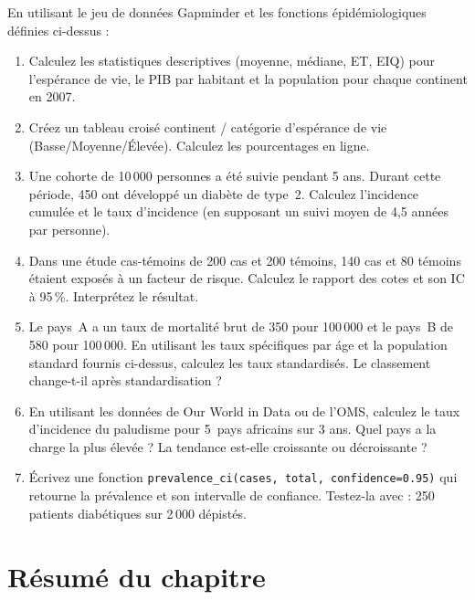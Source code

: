 \begin{exercise}
En utilisant le jeu de donn\'ees Gapminder et les fonctions \'epid\'emiologiques d\'efinies ci-dessus :
\begin{enumerate}
  \item Calculez les statistiques descriptives (moyenne, m\'ediane, ET, EIQ) pour l'esp\'erance de vie, le PIB par habitant et la population pour chaque continent en 2007.
  \item Cr\'eez un tableau crois\'e continent / cat\'egorie d'esp\'erance de vie (Basse/Moyenne/\'Elev\'ee). Calculez les pourcentages en ligne.
  \item Une cohorte de 10\,000 personnes a \'et\'e suivie pendant 5 ans. Durant cette p\'eriode, 450 ont d\'evelopp\'e un diab\`ete de type~2. Calculez l'incidence cumul\'ee et le taux d'incidence (en supposant un suivi moyen de 4,5 ann\'ees par personne).
  \item Dans une \'etude cas-t\'emoins de 200 cas et 200 t\'emoins, 140 cas et 80 t\'emoins \'etaient expos\'es \`a un facteur de risque. Calculez le rapport des cotes et son IC \`a 95\,\%. Interpr\'etez le r\'esultat.
  \item Le pays~A a un taux de mortalit\'e brut de 350 pour 100\,000 et le pays~B de 580 pour 100\,000. En utilisant les taux sp\'ecifiques par \'age et la population standard fournis ci-dessus, calculez les taux standardis\'es. Le classement change-t-il apr\`es standardisation ?
  \item En utilisant les donn\'ees de Our World in Data ou de l'OMS, calculez le taux d'incidence du paludisme pour 5~pays africains sur 3 ans. Quel pays a la charge la plus \'elev\'ee ? La tendance est-elle croissante ou d\'ecroissante ?
  \item \'Ecrivez une fonction \texttt{prevalence\_ci(cases, total, confidence=0.95)} qui retourne la pr\'evalence et son intervalle de confiance. Testez-la avec : 250 patients diab\'etiques sur 2\,000 d\'epist\'es.
\end{enumerate}
\end{exercise}

\section{R\'esum\'e du chapitre}

